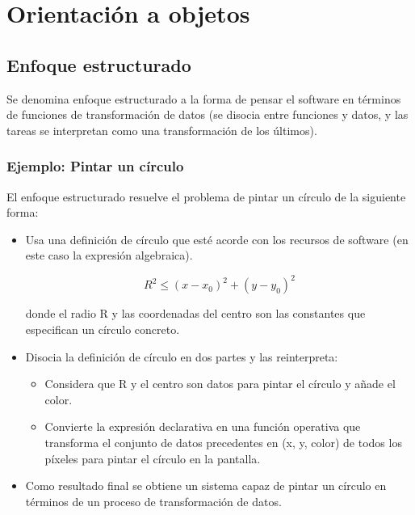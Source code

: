 
\section{Orientación a objetos}
\label{sec:org3620eb4}
\subsection{Enfoque estructurado}
\label{sec:orgc590b61} Se denomina enfoque estructurado a la forma de
pensar el software en términos de funciones de transformación de datos
(se disocia entre funciones y datos, y las tareas se interpretan como
una transformación de los últimos).

\subsubsection{Ejemplo: Pintar un círculo}
\label{sec:orge1ddd3a} El enfoque estructurado resuelve el problema de
pintar un círculo de la siguiente forma:
\begin{itemize}
\item Usa una definición de círculo que esté acorde con los recursos
de software (en este caso la expresión algebraica).

  \begin{equation} R^{2} \le (x - x_{0})^{2} + (y - y_{0})^{2}
  \end{equation}

  donde el radio R y las coordenadas del centro son las constantes que
especifican un círculo concreto.
\item Disocia la definición de círculo en dos partes y las
reinterpreta:
  \begin{itemize}
  \item Considera que R y el centro son datos para pintar el círculo y
añade el color.
  \item Convierte la expresión declarativa en una función operativa
que transforma el conjunto de datos precedentes en (x, y, color) de
todos los píxeles para pintar el círculo en la pantalla.
  \end{itemize}
\item Como resultado final se obtiene un sistema capaz de pintar un
círculo en términos de un proceso de transformación de datos.
\end{itemize}

